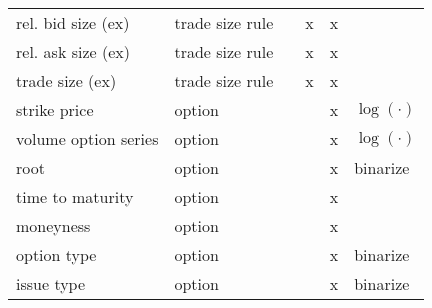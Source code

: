 \begin{tabular}{@{}llllll@{}}
    rel. bid size (ex)        & trade size rule      &      & x    & x    &               \\
    rel. ask size (ex)        & trade size rule      &      & x    & x    &               \\
    trade size (ex)           & trade size rule      &      & x    & x    &               \\
    strike price              & option               &      &      & x    & $\log(\cdot)$ \\
    volume option series      & option               &      &      & x    & $\log(\cdot)$ \\
    root                      & option               &      &      & x    & binarize      \\
    time to maturity          & option               &      &      & x    &               \\
    moneyness                 & option               &      &      & x    &               \\
    option type               & option               &      &      & x    & binarize      \\
    issue type                & option               &      &      & x    & binarize      \\ \bottomrule
\end{tabular}
